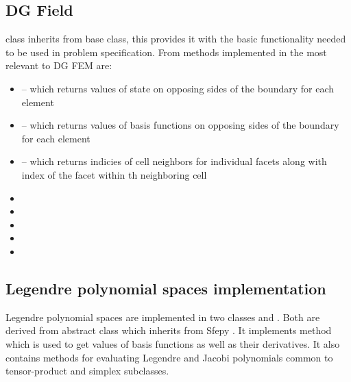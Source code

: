 \subsection{DG Field}
 class inherits from  base class, this provides it with the basic functionality needed
to be used in problem specification. From methods implemented in  the most relevant to DG FEM are:
\begin{itemize}
	\item {} -- which returns values of state on 
	opposing sides of the boundary for each element
	\item {} -- which returns values of basis functions 
	on opposing sides of the boundary for each element
	\item {} -- which returns indicies of cell neighbors 
	for individual facets along with index of the facet within th neighboring cell 
	\item {}
	\item {}
	\item {}
	\item {}
	\item {}
\end{itemize}

\subsection{Legendre polynomial spaces implementation}
Legendre polynomial spaces are implemented in two classes 
 and 
. Both are derived from abstract class 
 which inherits from Sfepy 
. It implements method  which is used to 
get values of basis functions as well as their derivatives. It also contains 
methods for evaluating Legendre and Jacobi polynomials common to tensor-product 
and simplex subclasses.




